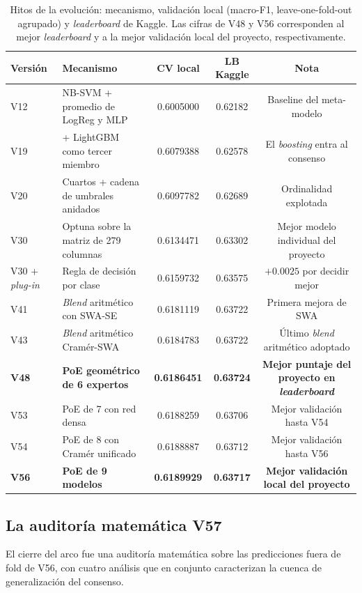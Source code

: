 \documentclass[journal]{IEEEtai}
\begin{document}
\begin{table}[htbp]
\centering
\caption{Hitos de la evoluci\'on: mecanismo, validaci\'on local (macro-F1, leave-one-fold-out agrupado) y \textit{leaderboard} de Kaggle. Las cifras de V48 y V56 corresponden al mejor \textit{leaderboard} y a la mejor validaci\'on local del proyecto, respectivamente.}
\label{tab:hitos}
\begin{tabular}{llccc}
\toprule
Versi\'on & Mecanismo & CV local & LB Kaggle & Nota \\
\midrule
V12 & NB-SVM + promedio de LogReg y MLP & 0.6005000 & 0.62182 & Baseline del meta-modelo \\
V19 & + LightGBM como tercer miembro & 0.6079388 & 0.62578 & El \textit{boosting} entra al consenso \\
V20 & Cuartos + cadena de umbrales anidados & 0.6097782 & 0.62689 & Ordinalidad explotada \\
V30 & Optuna sobre la matriz de 279 columnas & 0.6134471 & 0.63302 & Mejor modelo individual del proyecto \\
V30 + \textit{plug-in} & Regla de decisi\'on por clase & 0.6159732 & 0.63575 & $+0.0025$ por decidir mejor \\
V41 & \textit{Blend} aritm\'etico con SWA-SE & 0.6181119 & 0.63722 & Primera mejora de SWA \\
V43 & \textit{Blend} aritm\'etico Cram\'er-SWA & 0.6184783 & 0.63722 & \'Ultimo \textit{blend} aritm\'etico adoptado \\
\textbf{V48} & \textbf{PoE geom\'etrico de 6 expertos} & \textbf{0.6186451} & \textbf{0.63724} & \textbf{Mejor puntaje del proyecto en \textit{leaderboard}} \\
V53 & PoE de 7 con red densa & 0.6188259 & 0.63706 & Mejor validaci\'on hasta V54 \\
V54 & PoE de 8 con Cram\'er unificado & 0.6188887 & 0.63712 & Mejor validaci\'on hasta V56 \\
\textbf{V56} & \textbf{PoE de 9 modelos} & \textbf{0.6189929} & \textbf{0.63717} & \textbf{Mejor validaci\'on local del proyecto} \\
\bottomrule
\end{tabular}
\end{table}

\subsection{La auditor\'ia matem\'atica V57}

El cierre del arco fue una auditor\'ia matem\'atica sobre las predicciones fuera de fold de V56, con cuatro an\'alisis que en conjunto caracterizan la cuenca de generalizaci\'on del consenso.
\end{document}
